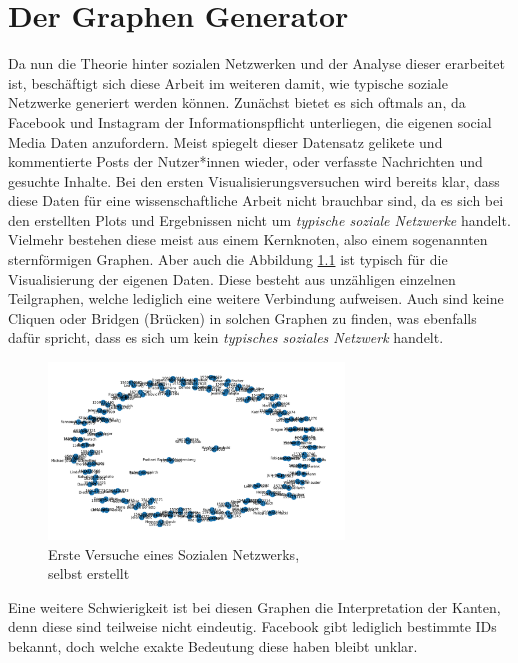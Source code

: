 \chapter{Der Graphen Generator}\label{ch:generierung}
Da nun die Theorie hinter sozialen Netzwerken und der Analyse dieser erarbeitet ist, beschäftigt sich diese Arbeit im weiteren damit, wie typische soziale Netzwerke generiert werden können. 
Zunächst bietet es sich oftmals an, da Facebook und Instagram der Informationspflicht unterliegen, die eigenen social Media Daten anzufordern. Meist spiegelt dieser Datensatz gelikete und kommentierte Posts der Nutzer*innen wieder, oder verfasste Nachrichten und gesuchte Inhalte.
Bei den ersten Visualisierungsversuchen wird bereits klar, dass diese Daten für eine wissenschaftliche Arbeit nicht brauchbar sind, da es sich bei den erstellten Plots und Ergebnissen nicht um \textit{ typische soziale Netzwerke} handelt. Vielmehr bestehen diese meist aus einem Kernknoten, also einem sogenannten sternförmigen Graphen. Aber auch die Abbildung \ref{fig:OwnData} ist typisch für die Visualisierung der eigenen Daten. Diese besteht aus unzähligen einzelnen Teilgraphen, welche lediglich eine weitere Verbindung aufweisen. Auch sind keine Cliquen oder Bridgen (Brücken) in solchen Graphen zu finden, was ebenfalls dafür spricht, dass es sich um kein \textit{typisches soziales Netzwerk} handelt. \\
\FloatBarrier
\begin{figure}[h!]
    \centering
    \includegraphics[width=0.7\textwidth]{Graphics/PlotOwnData.png}
    \caption{Erste Versuche eines Sozialen Netzwerks, \\
    selbst erstellt}
    \label{fig:OwnData}
\end{figure}
\FloatBarrier

Eine weitere Schwierigkeit ist bei diesen Graphen die Interpretation der Kanten, denn diese sind teilweise nicht eindeutig. 
Facebook gibt lediglich bestimmte IDs bekannt, doch welche exakte Bedeutung diese haben bleibt unklar.

